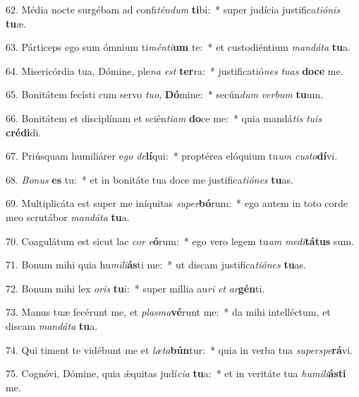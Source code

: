 62. Média nocte surgébam ad confi\textit{tén}\textit{dum} \textbf{ti}bi:~*  super judícia justifica\textit{ti}\textit{ó}\textit{nis} \textbf{tu}æ.\

63. Párticeps ego sum ómnium ti\textit{mén}\textit{ti}\textbf{um} te:~*  et custodiéntium \textit{man}\textit{dá}\textit{ta} \textbf{tu}a.\

64. Misericórdia tua, Dómine, ple\textit{na} \textit{est} \textbf{ter}ra:~*  justificatió\textit{nes} \textit{tu}\textit{as} \textbf{do}\textbf{ce} me.\

65. Bonitátem fecísti cum servo \textit{tu}\textit{o}, \textbf{Dó}mine:~*  secún\textit{dum} \textit{ver}\textit{bum} \textbf{tu}um.\

66. Bonitátem et disciplínam et scién\textit{ti}\textit{am} \textbf{do}ce me:~*  quia mandá\textit{tis} \textit{tu}\textit{is} \textbf{cré}\textbf{di}di.\

67. Priúsquam humiliárer e\textit{go} \textit{de}\textbf{lí}qui:~*  proptérea elóquium tu\textit{um} \textit{cus}\textit{to}\textbf{dí}vi.\

68. \textit{Bo}\textit{nus} \textbf{es} tu:~*  et in bonitáte tua doce me justifica\textit{ti}\textit{ó}\textit{nes} \textbf{tu}as.\

69. Multiplicáta est super me iníquitas \textit{su}\textit{per}\textbf{bó}rum:~*  ego autem in toto corde meo scrutábor \textit{man}\textit{dá}\textit{ta} \textbf{tu}a.\

70. Coagulátum est sicut lac \textit{cor} \textit{e}\textbf{ó}rum:~*  ego vero legem tu\textit{am} \textit{me}\textit{di}\textbf{tá}\textbf{tus} sum.\

71. Bonum mihi quia hu\textit{mi}\textit{li}\textbf{ás}ti me:~*  ut discam justifica\textit{ti}\textit{ó}\textit{nes} \textbf{tu}as.\

72. Bonum mihi lex \textit{o}\textit{ris} \textbf{tu}i:~*  super míllia au\textit{ri} \textit{et} \textit{ar}\textbf{gén}ti.\

73. Manus tuæ fecérunt me, et \textit{plas}\textit{ma}\textbf{vé}runt me:~*  da mihi intelléctum, et discam \textit{man}\textit{dá}\textit{ta} \textbf{tu}a.\

74. Qui timent te vidébunt me et \textit{læ}\textit{ta}\textbf{bún}tur:~*  quia in verba tua \textit{su}\textit{per}\textit{spe}\textbf{rá}vi.\

75. Cognóvi, Dómine, quia ǽquitas judí\textit{ci}\textit{a} \textbf{tu}a:~*  et in veritáte tua \textit{hu}\textit{mi}\textit{li}\textbf{ás}\textbf{ti} me.\

